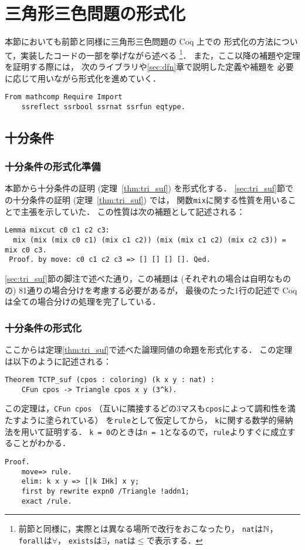 \section{三角形三色問題の形式化}
本節においても前節と同様に三角形三色問題の Coq 上での
形式化の方法について，実装したコードの一部を挙げながら述べる
\footnote
    {
      前節と同様に，実際とは異なる場所で改行をおこなったり，
      {\tt{nat}}は$\mathbb{N}$，{\tt{forall}}は$\forall$，
      {\tt{exists}}は$\exists$，{\tt{nat}}は$\leq$で表示する．
    }．
また，ここ以降の補題や定理を証明する際には，
次のライブラリや\ref{sec:dfn}章で説明した定義や補題を
必要に応じて用いながら形式化を進めていく．
\begin{lstlisting}[language=Coq]
  From mathcomp Require Import
    ssreflect ssrbool ssrnat ssrfun eqtype.
\end{lstlisting}
  
\subsection{十分条件} \label{sec_suf_coq}
\subsubsection{十分条件の形式化準備}
本節から十分条件の証明 (定理~\ref{thm:tri_suf}) を形式化する．
\ref{sec:tri_suf}節での十分条件の証明 (定理~\ref{thm:tri_suf}) では，
関数{\tt mix}に関する性質を用いることで主張を示していた．
この性質は次の補題として記述される：
\begin{lstlisting}[language=Coq]
 Lemma mixcut c0 c1 c2 c3:
  mix (mix (mix c0 c1) (mix c1 c2)) (mix (mix c1 c2) (mix c2 c3)) = mix c0 c3.
 Proof. by move: c0 c1 c2 c3 => [] [] [] []. Qed.
\end{lstlisting}
\ref{sec:tri_suf}節の脚注で述べた通り，この補題は (それぞれの場合は自明なものの) 81通りの場合分けを考慮する必要があるが，
最後のたった1行の記述で Coq は全ての場合分けの処理を完了している．

\subsubsection{十分条件の形式化}
ここからは定理\ref{thm:tri_suf}で述べた論理同値の命題を形式化する．
この定理は以下のように記述される：
\begin{lstlisting}[language=Coq]
  Theorem TCTP_suf (cpos : coloring) (k x y : nat) :
    CFun cpos -> Triangle cpos x y (3^k).
\end{lstlisting}
この定理は，{\tt{CFun cpos}}
（互いに隣接するどの3マスも{\tt{cpos}}によって調和性を満たすように塗られている）
を{\tt{rule}}として仮定してから，
{\tt{k}}に関する数学的帰納法を用いて証明する．
{\tt{k = 0}}のときは{\tt{n = 1}}となるので，{\tt{rule}}よりすぐに成立することがわかる．
\begin{lstlisting}[language=Coq]
  Proof.
    move=> rule.
    elim: k x y => [|k IHk] x y;
    first by rewrite expn0 /Triangle !addn1;
    exact /rule.
\end{lstlisting}

